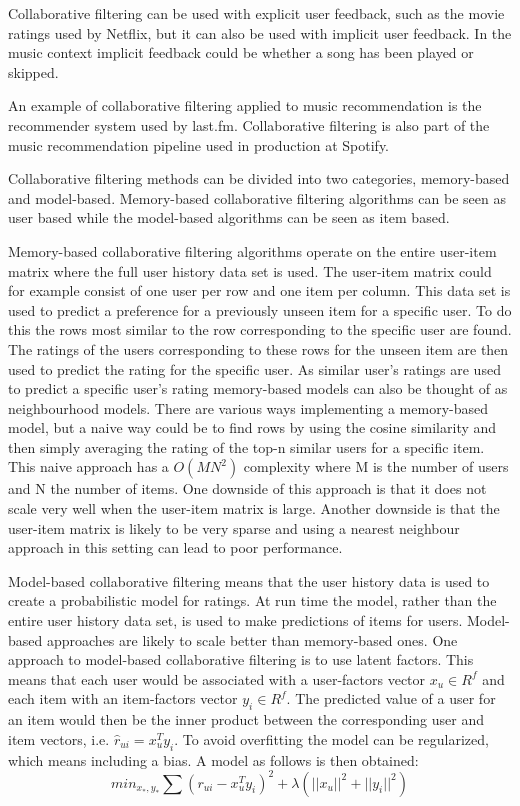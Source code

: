 Collaborative filtering can be used with explicit user feedback, such as the movie ratings used by Netflix, but it can also be used with implicit user feedback\cite{hu2008collaborative}. In the music context implicit feedback could be whether a song has been played or skipped.

An example of collaborative filtering applied to music recommendation is the recommender system used by last.fm. Collaborative filtering is also part of the music recommendation pipeline used in production at Spotify.

Collaborative filtering methods can be divided into two categories, memory-based and model-based. Memory-based collaborative filtering algorithms can be seen as user based while the model-based algorithms can be seen as item based\cite{sarwar2001item}.

Memory-based collaborative filtering algorithms operate on the entire user-item matrix where the full user history data set is used. The user-item matrix could for example consist of one user per row and one item per column. This data set is used to predict a preference for a previously unseen item for a specific user. To do this the rows most similar to the row corresponding to the specific user are found. The ratings of the users corresponding to these rows for the unseen item are then used to predict the rating for the specific user. As similar user's ratings are used to predict a specific user's rating memory-based models can also be thought of as neighbourhood models\cite{hu2008collaborative}. There are various ways implementing a memory-based model, but a naive way could be to find rows by using the cosine similarity and then simply averaging the rating of the top-n similar users for a specific item. This naive approach has a $O(MN^2)$ complexity where M is the number of users and N the number of items. One downside of this approach is that it does not scale very well when the user-item matrix is large. Another downside is that the user-item matrix is likely to be very sparse and using a nearest neighbour approach in this setting can lead to poor performance\cite{sarwar2001item}\cite{su2009survey}.

Model-based collaborative filtering means that the user history data is used to create a probabilistic model for ratings. At run time the model, rather than the entire user history data set, is used to make predictions of items for users. Model-based approaches are likely to scale better than memory-based ones\cite{sarwar2001item}. One approach to model-based collaborative filtering is to use latent factors. This means that each user would be associated with a user-factors vector $x_u \in R^f$ and each item with an item-factors vector $y_i \in R^f$. The predicted value of a user for an item would then be the inner product between the corresponding user and item vectors, i.e. $\hat{r}_{ui} = x_u^T y_i$. To avoid overfitting the model can be regularized, which means including a bias. A model as follows is then obtained: 
\begin{equation}
min_{x_*,y_*} \sum (r_{ui} - x_u^Ty_i)^2 +  \lambda(||x_u||^2 + ||y_i||^2)
\end{equation}

